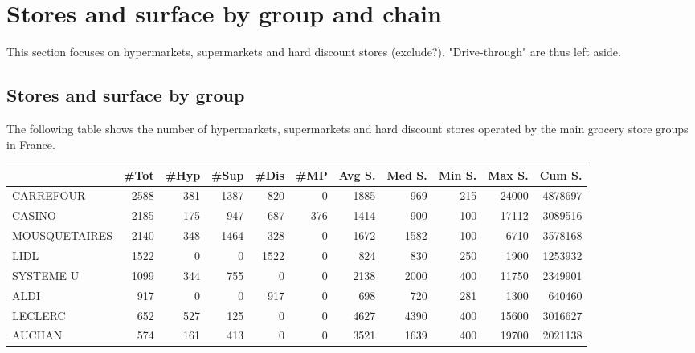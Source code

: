\documentclass[11pt]{article}
\begin{document}
\section{Stores and surface by group and chain}

This section focuses on hypermarkets, supermarkets and hard discount stores (exclude?). "Drive-through" are thus left aside.

\subsection{Stores and surface by group}

The following table shows the number of hypermarkets, supermarkets and hard discount stores operated by the main grocery store groups in France. 

\begin{table}[H]
\footnotesize
\setlength{\tabcolsep}{2pt}
\begin{tabular}{lrrrrrrrrrr}
\toprule
{} &       \#Tot &       \#Hyp &       \#Sup &       \#Dis &        \#MP &     Avg S. &     Med S. &     Min S. &     Max S. &     Cum S. \\
\midrule
CARREFOUR      &       2588 &        381 &       1387 &        820 &          0 &       1885 &        969 &        215 &      24000 &    4878697 \\
CASINO         &       2185 &        175 &        947 &        687 &        376 &       1414 &        900 &        100 &      17112 &    3089516 \\
MOUSQUETAIRES  &       2140 &        348 &       1464 &        328 &          0 &       1672 &       1582 &        100 &       6710 &    3578168 \\
LIDL           &       1522 &          0 &          0 &       1522 &          0 &        824 &        830 &        250 &       1900 &    1253932 \\
SYSTEME U      &       1099 &        344 &        755 &          0 &          0 &       2138 &       2000 &        400 &      11750 &    2349901 \\
ALDI           &        917 &          0 &          0 &        917 &          0 &        698 &        720 &        281 &       1300 &     640460 \\
LECLERC        &        652 &        527 &        125 &          0 &          0 &       4627 &       4390 &        400 &      15600 &    3016627 \\
AUCHAN         &        574 &        161 &        413 &          0 &          0 &       3521 &       1639 &        400 &      19700 &    2021138 \\

\end{tabular}
\end{table}
\end{document}

